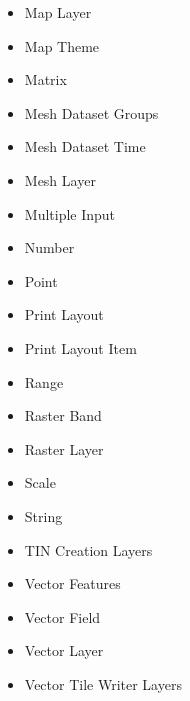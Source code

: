 \documentclass[letterpaper,10pt,english]{sphinxmanual}
\begin{document}
\begin{itemize}
\item {} 
\sphinxAtStartPar
Map Layer

\item {} 
\sphinxAtStartPar
Map Theme

\item {} 
\sphinxAtStartPar
Matrix

\item {} 
\sphinxAtStartPar
Mesh Dataset Groups

\item {} 
\sphinxAtStartPar
Mesh Dataset Time

\item {} 
\sphinxAtStartPar
Mesh Layer

\item {} 
\sphinxAtStartPar
Multiple Input

\item {} 
\sphinxAtStartPar
Number

\item {} 
\sphinxAtStartPar
Point

\item {} 
\sphinxAtStartPar
Print Layout

\item {} 
\sphinxAtStartPar
Print Layout Item

\item {} 
\sphinxAtStartPar
Range

\item {} 
\sphinxAtStartPar
Raster Band

\item {} 
\sphinxAtStartPar
Raster Layer

\item {} 
\sphinxAtStartPar
Scale

\item {} 
\sphinxAtStartPar
String

\item {} 
\sphinxAtStartPar
TIN Creation Layers

\item {} 
\sphinxAtStartPar
Vector Features

\item {} 
\sphinxAtStartPar
Vector Field

\item {} 
\sphinxAtStartPar
Vector Layer

\item {} 
\sphinxAtStartPar
Vector Tile Writer Layers

\end{itemize}
\end{document}
